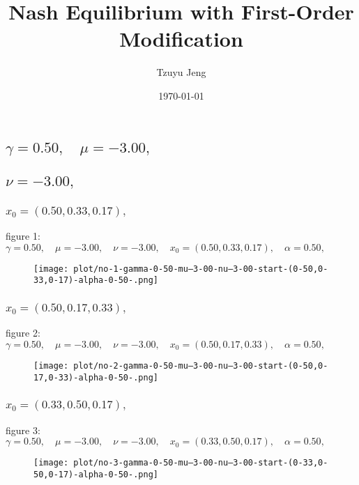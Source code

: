\documentclass[a4paper]{article}
\title{
      Nash Equilibrium with First-Order Modification
   }
\author{Tzuyu Jeng}
\date{\today}
\begin{document}
      \maketitle
      \begin{multicols*}{2}
   

   \section{\(\gamma = 0.50,\quad \mu = -3.00,\quad \)}
   

   \subsection{\(\nu = -3.00,\quad \)}
   

   \subsubsection{\(x_0 = (0.50,0.33,0.17),\quad \)}
   
figure 1: \(\gamma = 0.50,\quad \mu = -3.00,\quad \nu = -3.00,\quad x_0 = (0.50,0.33,0.17),\quad \alpha = 0.50,\quad \)
   \begin{figure}[H]
   \centering
   \texttt{[image: plot/no-1-gamma-0-50-mu--3-00-nu--3-00-start-(0-50,0-33,0-17)-alpha-0-50-.png]}
   \end{figure}
   

   \subsubsection{\(x_0 = (0.50,0.17,0.33),\quad \)}
   
figure 2: \(\gamma = 0.50,\quad \mu = -3.00,\quad \nu = -3.00,\quad x_0 = (0.50,0.17,0.33),\quad \alpha = 0.50,\quad \)
   \begin{figure}[H]
   \centering
   \texttt{[image: plot/no-2-gamma-0-50-mu--3-00-nu--3-00-start-(0-50,0-17,0-33)-alpha-0-50-.png]}
   \end{figure}
   

   \subsubsection{\(x_0 = (0.33,0.50,0.17),\quad \)}
   
figure 3: \(\gamma = 0.50,\quad \mu = -3.00,\quad \nu = -3.00,\quad x_0 = (0.33,0.50,0.17),\quad \alpha = 0.50,\quad \)
   \begin{figure}[H]
   \centering
   \texttt{[image: plot/no-3-gamma-0-50-mu--3-00-nu--3-00-start-(0-33,0-50,0-17)-alpha-0-50-.png]}
   \end{figure}
   


\end{multicols*}
\end{document}
